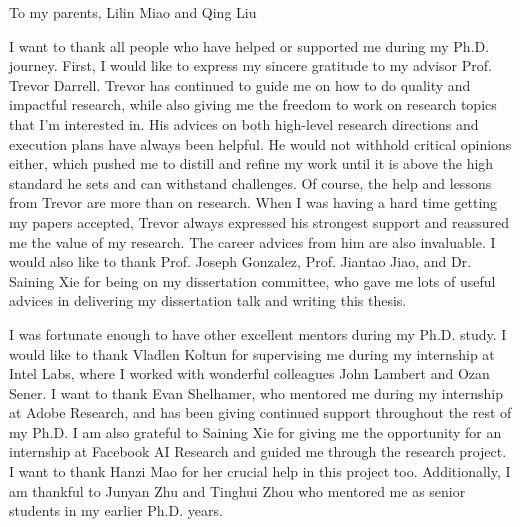 \documentclass{ucbthesis}
\begin{document}
\begin{frontmatter}

\begin{dedication}
\null\vfil
\begin{center}
To my parents, Lilin Miao and Qing Liu
\end{center}
\vfil\null
\end{dedication}


\tableofcontents
\clearpage
\listoffigures
\clearpage
\listoftables

\begin{acknowledgements}
I want to thank all people who have helped or supported me during my Ph.D. journey. First, I would like to express my sincere gratitude to my advisor Prof. Trevor Darrell. Trevor has continued to guide me on how to do quality and impactful research, while also giving me the freedom to work on research topics that I'm interested in. His advices on both high-level research directions and execution plans have always been helpful. He would not withhold critical opinions either, which pushed me to distill and refine my work until it is above the high standard he sets and can withstand challenges. Of course, the help and lessons from Trevor are more than on research. When I was having a hard time getting my papers accepted, Trevor always expressed his strongest support and reassured me the value of my research. The career advices from him are also invaluable. I would also like to thank Prof. Joseph Gonzalez, Prof. Jiantao Jiao, and Dr. Saining Xie for being on my dissertation committee, who gave me lots of useful advices in delivering my dissertation talk and writing this thesis.

I was fortunate enough to have other excellent mentors during my Ph.D. study. I would like to thank Vladlen Koltun for supervising me during my internship at Intel Labs, where I worked with wonderful colleagues John Lambert and Ozan Sener. I want to thank Evan Shelhamer, who mentored me during my internship at Adobe Research, and has been giving continued support throughout the rest of my Ph.D. I am also grateful to Saining Xie for giving me the opportunity for an internship at Facebook AI Research and guided me through the research project. I want to thank Hanzi Mao for her crucial help in this project too. Additionally, I am thankful to Junyan Zhu and Tinghui Zhou who mentored me as senior students in my earlier Ph.D. years. 


\end{acknowledgements}
\end{frontmatter}
\end{document}
